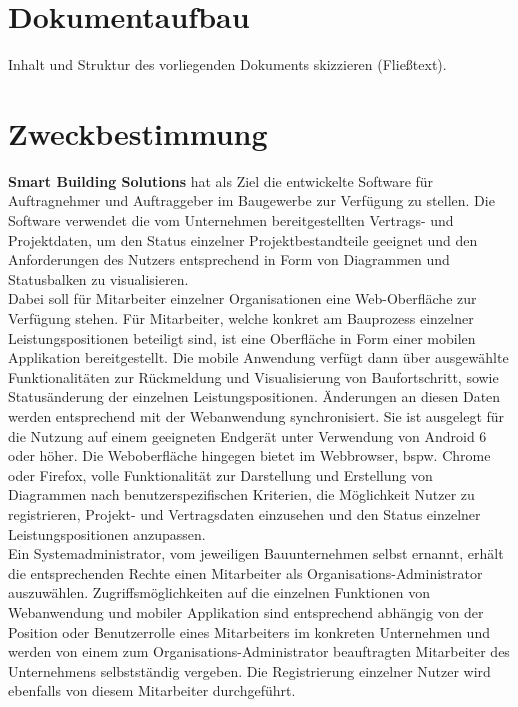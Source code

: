 \section{Dokumentaufbau}\label{sec:dokumentaufbau}
\begin{tcolorbox}
    Inhalt und Struktur des vorliegenden Dokuments skizzieren (Fließtext).
\end{tcolorbox}

\section{Zweckbestimmung}\label{sec:zweckbestimmung}
\textbf{Smart Building Solutions} hat als Ziel die entwickelte Software f\"ur Auftragnehmer und Auftraggeber im Baugewerbe zur Verf\"ugung zu stellen.  Die Software verwendet die vom Unternehmen bereitgestellten Vertrags- und Projektdaten,  um den Status einzelner Projektbestandteile geeignet und den Anforderungen des Nutzers entsprechend in Form von Diagrammen und Statusbalken zu visualisieren. \\
Dabei soll f\"ur Mitarbeiter einzelner Organisationen eine Web-Oberfl\"ache zur Verf\"ugung stehen.  F\"ur  Mitarbeiter,  welche konkret am Bauprozess einzelner Leistungspositionen beteiligt sind,  ist eine Oberfl\"ache in Form einer mobilen Applikation bereitgestellt.  Die mobile Anwendung verf\"ugt dann \"uber ausgew\"ahlte Funktionalit\"aten zur R\"uckmeldung und Visualisierung von Baufortschritt,  sowie Status\"anderung der einzelnen Leistungspositionen.  \"Anderungen an diesen Daten werden entsprechend mit der Webanwendung synchronisiert.  Sie ist ausgelegt f\"ur die Nutzung auf einem geeigneten Endger\"at unter Verwendung von Android 6 oder h\"oher.  Die Weboberfl\"ache hingegen bietet im Webbrowser,  bspw. Chrome oder Firefox, volle Funktionalit\"at zur Darstellung und Erstellung von Diagrammen nach benutzerspezifischen Kriterien, die M\"oglichkeit Nutzer zu registrieren,  Projekt- und Vertragsdaten einzusehen und den Status einzelner Leistungspositionen anzupassen. \\
Ein Systemadministrator, vom jeweiligen Bauunternehmen selbst ernannt,  erh\"alt die entsprechenden Rechte  einen Mitarbeiter als Organisations-Administrator auszuw\"ahlen.
Zugriffsm\"oglichkeiten auf die einzelnen Funktionen von Webanwendung und mobiler Applikation sind entsprechend abh\"angig von der Position oder Benutzerrolle eines Mitarbeiters im konkreten Unternehmen und werden von einem zum Organisations-Administrator beauftragten Mitarbeiter des Unternehmens selbstst\"andig vergeben.  Die Registrierung einzelner Nutzer wird ebenfalls von diesem Mitarbeiter durchgef\"uhrt.

